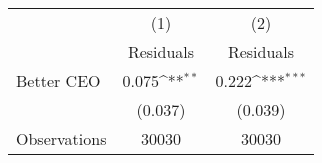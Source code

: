 {
\def\sym#1{\ifmmode^{#1}\else\(^{#1}\)\fi}
\begin{tabular}{l*{2}{c}}
\hline\hline
                    &\multicolumn{1}{c}{(1)}&\multicolumn{1}{c}{(2)}\\
                    &\multicolumn{1}{c}{Residuals}&\multicolumn{1}{c}{Residuals}\\
\hline
Better CEO          &       0.075\sym{**} &       0.222\sym{***}\\
                    &     (0.037)         &     (0.039)         \\
\hline
Observations        &       30030         &       30030         \\
\hline\hline
\end{tabular}
}
